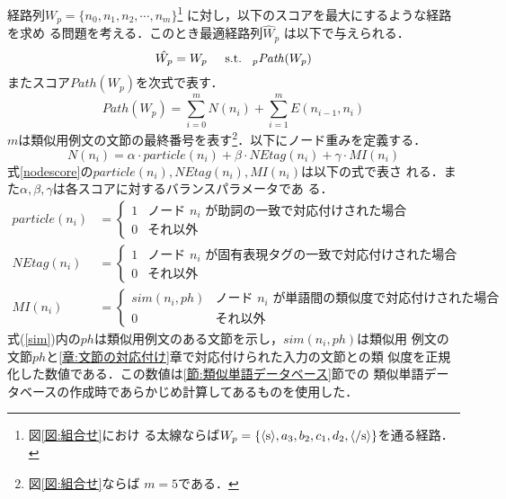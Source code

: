 \documentclass[japanese]{jnlp_1.4}
\newcommand{\argmax}{}
\begin{document}
経路列$W_p=\{n_0,n_1,n_2,\cdots ,n_m\}$\footnote{図\ref{図:組合せ}におけ
る太線ならば$W_p=\{\langle{\rm s}\rangle,a_3,b_2,c_1,d_2,\langle/{\rm
s}\rangle\}$を通る経路．} に対し，以下のスコアを最大にするような経路を求め
る問題を考える．このとき最適経路列$\hat W_p$ は以下で与えられる．
\begin{equation}
 \hat{W_p}=W_p\hspace{5mm} {\rm s.t.}\hspace{3mm}\argmax_p \mathit{Path}(W_p)
\end{equation}
またスコア$Path(W_p)$を次式で表す．{\small
\begin{equation}
\label{scoredp}
 \mathit{Path}(W_p)=\sum_{i=0}^{m}N(n_i)+\sum_{i=1}^{m}E(n_{i-1},n_i)
\end{equation}
}
$m$は類似用例文の文節の最終番号を表す\footnote{図\ref{図:組合せ}ならば
$m=5$である．}．以下にノード重みを定義する．
\begin{equation}
 N(n_i) = \alpha\cdot \mathit{particle}(n_i)+\beta\cdot \mathit{NEtag}(n_i)
	+\gamma\cdot \mathit{MI}(n_i)
\label{nodescore}
\end{equation}
式\ref{nodescore}の$particle(n_i), NEtag(n_i), MI(n_i)$は以下の式で表さ
れる．また$\alpha,\beta,\gamma$は各スコアに対するバランスパラメータであ
る．
{\allowdisplaybreaks
\begin{align}
 \mathit{particle}(n_i) & =
  \begin{cases}
	1 & \text{ノード $n_i$ が助詞の一致で対応付けされた場合}\\
	0 & \text{それ以外}
  \end{cases}
  \label{particle} \\
 \mathit{NEtag}(n_i) & =
   \begin{cases}
	1 & \text{ノード $n_i$ が固有表現タグの一致で対応付けされた場合}\\
	0 & \text{それ以外}
   \end{cases}
   \label{NEtag}\\
 \mathit{MI}(n_i) & =
   \begin{cases}
	\mathit{sim}(n_i, ph) & \text{ノード $n_i$ が単語間の類似度で対応付けされた場合}\\
	0 & \text{それ以外}
   \end{cases}
   \label{sim}
\end{align}
}
式(\ref{sim})内の$ph$は類似用例文のある文節を示し，$sim(n_i,ph)$は類似用
例文の文節$ph$と\ref{章:文節の対応付け}章で対応付けられた入力の文節との類
似度を正規化した数値である．この数値は\ref{節:類似単語データベース}節での
類似単語データベースの作成時であらかじめ計算してあるものを使用した．
\end{document}
